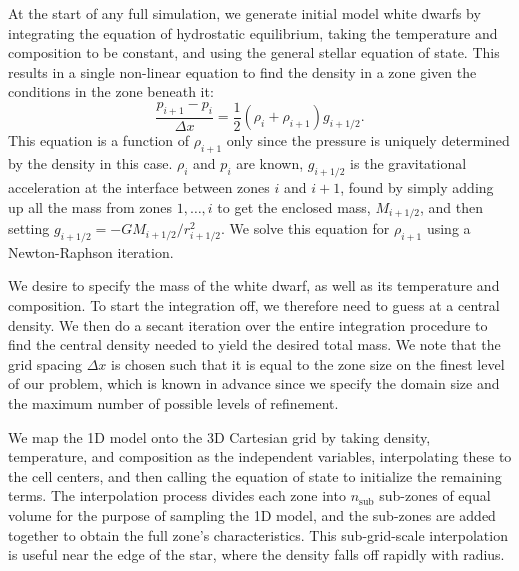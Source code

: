 \documentclass[12pt,preprint]{aastex}
\begin{document}
At the start of any full simulation, we generate initial model white dwarfs by integrating the equation of hydrostatic equilibrium, taking the temperature and composition to be constant, and using the general stellar equation of state.  This results in a single non-linear equation to find the density in a zone given the conditions in the zone beneath it:
\begin{equation}
\frac{p_{i+1} - p_i}{\Delta x} = \frac{1}{2} (\rho_i + \rho_{i+1}) g_{i+1/2}.
\end{equation}
This equation is a function of $\rho_{i+1}$ only since the pressure is uniquely determined by the density in this case. $\rho_i$ and $p_i$ are known,  $g_{i+1/2}$ is the gravitational acceleration at the interface between zones $i$ and $i+1$, found by simply adding up all the mass from zones $1, \ldots, i$ to get the enclosed mass, $M_{i+1/2}$, and then setting $g_{i+1/2} = -GM_{i+1/2}/r_{i+1/2}^2$. We solve this equation for $\rho_{i+1}$ using a Newton-Raphson iteration.

We desire to specify the mass of the white dwarf, as well as its temperature and composition. To start the integration off, we therefore need to guess at a central density.  We then do a secant iteration over the entire integration procedure to find the central density needed to yield the desired total mass.  We note that the grid spacing $\Delta x$ is chosen such that it is equal to the zone size on the finest level of our problem, which is known in advance since we specify the domain size and the maximum number of possible levels of refinement.

We map the 1D model onto the 3D Cartesian grid by taking density, temperature, and composition as the independent variables, interpolating these to the cell centers, and then calling the equation of state to initialize the remaining terms.  The interpolation process divides each zone into $n_{\text{sub}}$ sub-zones of equal volume for the purpose of sampling the 1D model, and the sub-zones are added together to obtain the full zone's characteristics. This sub-grid-scale interpolation is useful near the edge of the star, where the density falls off rapidly with radius.
\end{document}
